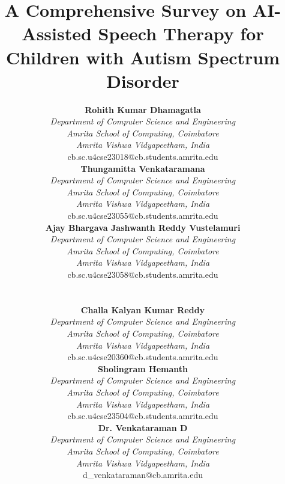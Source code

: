 \documentclass[conference]{IEEEtran}
\begin{document}
\title{A Comprehensive Survey on AI-Assisted Speech Therapy for Children with Autism Spectrum Disorder}

\newcommand{\authcol}[1]{%
  \begin{minipage}[t]{0.31\textwidth}\centering\small #1\end{minipage}}

\author{%
\authcol{%
  \textbf{Rohith Kumar Dhamagatla}\\[2pt]
  \textit{Department of Computer Science and Engineering}\\
  \textit{Amrita School of Computing, Coimbatore}\\
  \textit{Amrita Vishwa Vidyapeetham, India}\\
  cb.sc.u4cse23018@cb.students.amrita.edu}
\hfill
\authcol{%
  \textbf{Thungamitta Venkataramana}\\[2pt]
  \textit{Department of Computer Science and Engineering}\\
  \textit{Amrita School of Computing, Coimbatore}\\
  \textit{Amrita Vishwa Vidyapeetham, India}\\
  cb.sc.u4cse23055@cb.students.amrita.edu}
\hfill
\authcol{%
  \textbf{Ajay Bhargava Jashwanth Reddy Vustelamuri}\\[2pt]
  \textit{Department of Computer Science and Engineering}\\
  \textit{Amrita School of Computing, Coimbatore}\\
  \textit{Amrita Vishwa Vidyapeetham, India}\\
  cb.sc.u4cse23058@cb.students.amrita.edu}
\\[12pt]

\authcol{%
  \textbf{Challa Kalyan Kumar Reddy}\\[2pt]
  \textit{Department of Computer Science and Engineering}\\
  \textit{Amrita School of Computing, Coimbatore}\\
  \textit{Amrita Vishwa Vidyapeetham, India}\\
  cb.sc.u4cse20360@cb.students.amrita.edu}
\hfill
\authcol{%
  \textbf{Sholingram Hemanth}\\[2pt]
  \textit{Department of Computer Science and Engineering}\\
  \textit{Amrita School of Computing, Coimbatore}\\
  \textit{Amrita Vishwa Vidyapeetham, India}\\
  cb.sc.u4cse23504@cb.students.amrita.edu}
\hfill
\authcol{%
  \textbf{Dr. Venkataraman D}\\[2pt]
  \textit{Department of Computer Science and Engineering}\\
  \textit{Amrita School of Computing, Coimbatore}\\
  \textit{Amrita Vishwa Vidyapeetham, India}\\
  d\_venkataraman@cb.amrita.edu}
}
\end{document}
